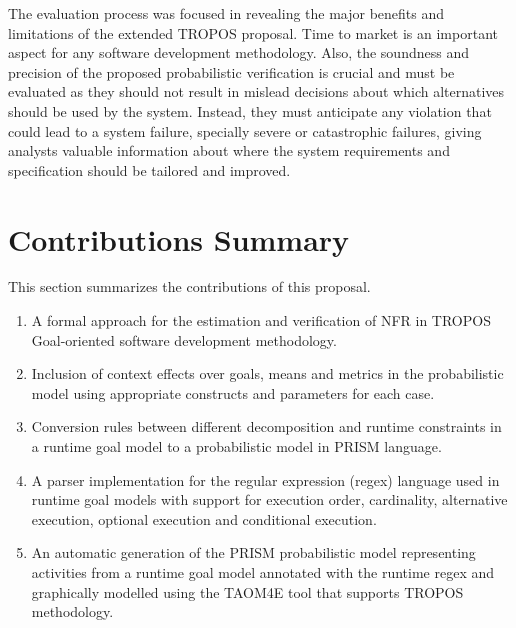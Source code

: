 
The evaluation process was focused in revealing the major benefits and limitations of the extended TROPOS proposal. Time to market is an important aspect for any software development methodology. Also, the soundness and precision of the proposed probabilistic verification is crucial and must be evaluated as they should not result in mislead decisions about which alternatives should be used by the system. Instead, they must anticipate any violation that could lead to a system failure, specially severe or catastrophic failures, giving analysts valuable information about where the system requirements and specification should be tailored and improved.

\section{Contributions Summary}

This section summarizes the contributions of this proposal.


\begin{enumerate}

\item A formal approach for the estimation and verification of NFR in TROPOS Goal-oriented software development methodology.
\medskip

\item Inclusion of context effects over goals, means and metrics in the probabilistic model using appropriate constructs and parameters for each case.
\medskip

\item Conversion rules between different decomposition and runtime constraints in a runtime goal model to a probabilistic model in PRISM language.
\medskip

\item A parser implementation for the regular expression (regex) language used in runtime goal models with support for execution order, cardinality, alternative execution, optional execution and conditional execution. 
\medskip

\item An automatic generation of the PRISM probabilistic model representing activities from a runtime goal model annotated with the runtime regex and graphically modelled using the TAOM4E tool that supports TROPOS methodology.

\end{enumerate}

